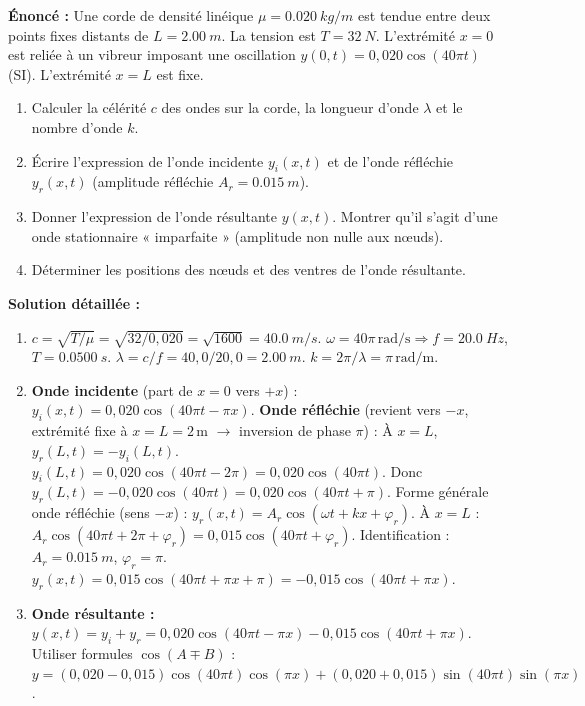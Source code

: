\documentclass[11pt]{article}
\begin{document}
\begin{exoresolu}
\textbf{Énoncé :} Une corde de densité linéique $\mu = \SI{0,020}{kg/m}$ est tendue entre deux points fixes distants de $L = \SI{2,00}{m}$. La tension est $T = \SI{32}{N}$. L'extrémité $x=0$ est reliée à un vibreur imposant une oscillation $y(0,t) = 0,020 \cos(40\pi t)$ (SI). L'extrémité $x=L$ est fixe.
\begin{enumerate}
    \item Calculer la célérité $c$ des ondes sur la corde, la longueur d'onde $\lambda$ et le nombre d'onde $k$.
    \item Écrire l'expression de l'onde incidente $y_i(x,t)$ et de l'onde réfléchie $y_r(x,t)$ (amplitude réfléchie $A_r = \SI{0,015}{m}$).
    \item Donner l'expression de l'onde résultante $y(x,t)$. Montrer qu'il s'agit d'une onde stationnaire « imparfaite » (amplitude non nulle aux nœuds).
    \item Déterminer les positions des nœuds et des ventres de l'onde résultante.
\end{enumerate}
\tcblower
\textbf{Solution détaillée :}
\begin{enumerate}
    \item $c = \sqrt{T/\mu} = \sqrt{32 / 0,020} = \sqrt{1600} = \SI{40,0}{m/s}$.
    $\omega = 40\pi\,\text{rad/s} \Rightarrow f = \SI{20,0}{Hz}$, $T = \SI{0,0500}{s}$.
    $\lambda = c/f = 40,0 / 20,0 = \SI{2,00}{m}$.
    $k = 2\pi/\lambda = \pi\,\text{rad/m}$.
    \item \textbf{Onde incidente} (part de $x=0$ vers $+x$) : $y_i(x,t) = 0,020 \cos(40\pi t - \pi x)$.
    \textbf{Onde réfléchie} (revient vers $-x$, extrémité fixe à $x=L=2\,\text{m}$ $\rightarrow$ inversion de phase $\pi$) :
    À $x=L$, $y_r(L,t) = -y_i(L,t)$.
    $y_i(L,t) = 0,020 \cos(40\pi t - 2\pi) = 0,020 \cos(40\pi t)$.
    Donc $y_r(L,t) = -0,020 \cos(40\pi t) = 0,020 \cos(40\pi t + \pi)$.
    Forme générale onde réfléchie (sens $-x$) : $y_r(x,t) = A_r \cos(\omega t + k x + \varphi_r)$.
    À $x=L$ : $A_r \cos(40\pi t + 2\pi + \varphi_r) = 0,015 \cos(40\pi t + \varphi_r)$.
    Identification : $A_r = \SI{0,015}{m}$, $\varphi_r = \pi$.
    $y_r(x,t) = 0,015 \cos(40\pi t + \pi x + \pi) = -0,015 \cos(40\pi t + \pi x)$.
    \item \textbf{Onde résultante :} $y(x,t) = y_i + y_r = 0,020 \cos(40\pi t - \pi x) - 0,015 \cos(40\pi t + \pi x)$.
    Utiliser formules $\cos(A \mp B)$ :
    $y = (0,020 - 0,015)\cos(40\pi t)\cos(\pi x) + (0,020 + 0,015)\sin(40\pi t)\sin(\pi x)$.

\end{enumerate}
\end{exoresolu}
\end{document}

